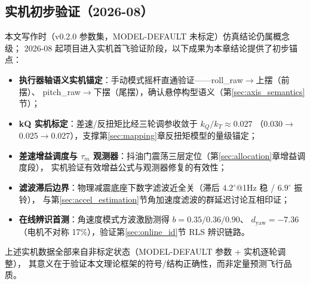 \subsection{实机初步验证（2026-08）}
本文写作时（v0.2.0 参数集，MODEL-DEFAULT 未标定）仿真结论仍属概念级；
2026-08 起项目进入实机首飞验证阶段，以下成果为本章结论提供了初步锚点：
\begin{itemize}
    \item \textbf{执行器轴语义实机锚定}：手动模式摇杆直通验证——roll\_raw$\to$上摆（前摆）、
          pitch\_raw$\to$下摆（尾摆），确认悬停构型语义（第\ref{sec:axis_semantics}节）；
    \item \textbf{kQ 实机标定}：差速/反扭矩比经三轮调参收敛于 $k_Q/k_T\approx0.027$
          （0.030$\to$0.025$\to$0.027），支撑第\ref{sec:mapping}章反扭矩模型的量级锚定；
    \item \textbf{差速增益调度与 $\tau_m$ 观测器}：抖油门震荡三层定位（第\ref{sec:allocation}章增益调度段），
          实机验证有效增益公式与观测器修复的有效性；
    \item \textbf{滤波滞后边界}：物理减震底座下数字滤波近全关（滞后 $4.2^\circ$@1Hz 稳 / $6.9^\circ$ 振铃），
          与第\ref{sec:accel_estimation}节角加速度滤波的群延迟讨论互相印证；
    \item \textbf{在线辨识首测}：角速度模式方波激励测得 $b=0.35/0.36/0.90$、
          $d_{\text{yaw}}=-7.36$（电机不对称 17\%），验证第\ref{sec:online_id}节 RLS 辨识链路。
\end{itemize}
上述实机数据全部来自非标定状态（MODEL-DEFAULT 参数 + 实机逐轮调整），
其意义在于验证本文理论框架的符号/结构正确性，而非定量预测飞行品质。
